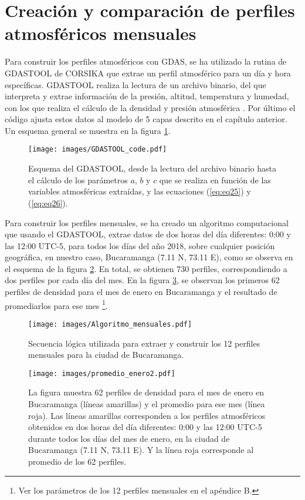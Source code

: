 \section{Creaci\'on y comparaci\'on de perfiles atmosf\'ericos mensuales}
Para construir los perfiles atmosféricos con GDAS, se ha utilizado la rutina de GDASTOOL de CORSIKA\cite{Heck1998} que extrae un perfil atmosférico para un día y hora específicas. GDASTOOL realiza la lectura de un archivo binario, del que interpreta y extrae información de la presión, altitud, temperatura y humedad, con los que realiza el cálculo de la densidad y presión atmosférica \cite{GDAS_Auger}. Por último el código ajusta estos datos al modelo de 5 capas descrito en el capítulo anterior. Un esquema general se muestra en la figura \ref{fig:fig13}.
\begin{figure}[htb!]
\centering
\texttt{[image: images/GDASTOOL\_code.pdf]}
\caption[Esquema de GDASTOOL]{Esquema del GDASTOOL, desde la lectura del archivo binario hasta el cálculo de los parámetros $a$, $b$ y $c$ que se realiza en función de las variables atmosféricas extraídas, y las ecuaciones (\ref{eq:eq25}) y (\ref{eq:eq26}).}
 \label{fig:fig13}
 \end{figure}
\newpage
Para construir los perfiles mensuales, se ha creado un algoritmo computacional que usando el GDASTOOL, extrae datos de dos horas del día diferentes: 0:00 y las 12:00 UTC-5, para todos los días del año 2018, sobre cualquier posición geográfica, en nuestro caso, Bucaramanga (7.11 N, 73.11 E), como se observa en el esquema de la figura \ref{fig:fig14}. En total, se obtienen 730 perfiles, correspondiendo a dos perfiles por cada día del mes. En la figura \ref{fig:fig15}, se observan los primeros 62 perfiles de densidad para el mes de enero en Bucaramanga y el resultado de promediarlos para ese mes \footnote{Ver los parámetros de los 12 perfiles mensuales en el apéndice B.}.\\

\begin{figure}[htb!]
\centering
\texttt{[image: images/Algoritmo\_mensuales.pdf]}
\caption[Secuencia lógica para obtener los perfiles mensuales usando GDASTOOL.]{Secuencia lógica utilizada para extraer y construir los 12 perfiles mensuales para la ciudad de Bucaramanga.}
 \label{fig:fig14}
 \end{figure}
\begin{figure}[htb!]
\centering
\texttt{[image: images/promedio\_enero2.pdf]}
\caption[Promedio de la densidad atmosférica para la ciudad de Bucaramanga en enero.]{La figura muestra 62 perfiles de densidad para el mes de enero en Bucaramanga (líneas amarillas) y el promedio para ese mes (línea roja). Las líneas amarillas corresponden a los perfiles atmosféricos obtenidos en dos horas del día diferentes: 0:00 y las 12:00 UTC-5 durante todos los días del mes de enero, en la ciudad de Bucaramanga (7.11 N, 73.11 E). Y la línea roja corresponde al promedio de los 62 perfiles.}
\label{fig:fig15}
\end{figure}

